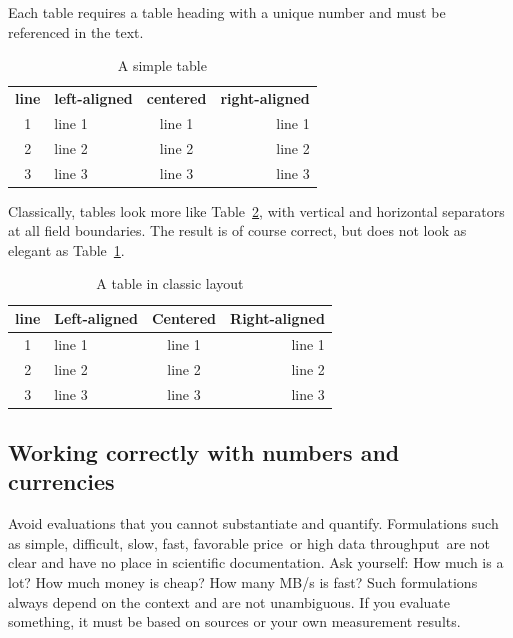 \documentclass{llncs}
\begin{document}
Each table requires a table heading with a unique number and must be referenced in the text.

\begin{table}
  \centering
  \caption{A simple table}
  \label{Simple_Table_Label}
  \begin{tabular}{clcr}
    \hline\noalign{\smallskip}
    \textbf{line} & \textbf{left-aligned} & \textbf{centered} & \textbf{right-aligned} \\
    \noalign{\smallskip}
    \hline
    \noalign{\smallskip}
    1             & line 1                & line 1            & line 1                 \\ \hline
    2             & line 2                & line 2            & line 2                 \\ \hline
    3             & line 3                & line 3            & line 3                 \\ \hline
    \hline
  \end{tabular}
\end{table}

Classically, tables look more like Table~\ref{Standard_Table_Label}, with vertical and horizontal separators at all field boundaries. The result is of course correct, but does not look as elegant as Table~\ref{Simple_Table_Label}.


\begin{table}
  \centering
  \caption{A table in classic layout}\label{Standard_Table_Label}
  \begin{tabular}{|c|l|c|r|}
    \hline
    \textbf{line} & \textbf{Left-aligned} & \textbf{Centered} & \textbf{Right-aligned} \\
    \hline
    1             & line 1                & line 1            & line 1                 \\ \hline
    2             & line 2                & line 2            & line 2                 \\ \hline
    3             & line 3                & line 3            & line 3                 \\ \hline
  \end{tabular}
\end{table}


\subsection{Working correctly with numbers and currencies}

Avoid evaluations that you cannot substantiate and quantify. Formulations such as \glqq simple\grqq, \glqq difficult\grqq, \glqq slow\grqq, \glqq fast\grqq, \glqq favorable price\grqq\ or \glqq high data throughput\grqq\ are not clear and have no place in scientific documentation. Ask yourself: How much is a lot? How much money is cheap? How many MB/s is fast? Such formulations always depend on the context and are not unambiguous. If you evaluate something, it must be based on sources or your own measurement results.
\end{document}
